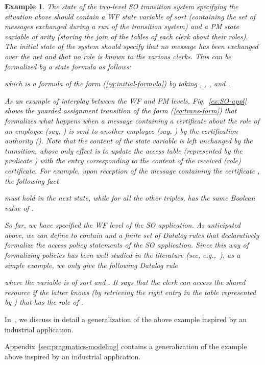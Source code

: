 \documentclass[conference]{IEEEtran}
\newtheorem{example}{Example}
\newcommand{\close}{\IEEEQEDclosed}
\begin{document}
\begin{example}
  The state of the two-level SO transition system specifying the situation
  above should contain a WF state variable  of sort
   (containing the set of messages exchanged during
  a run of the transition system) and a PM state variable
   of arity  (storing the join of the tables of each clerk about
  their roles).  The initial state of the system
  should specify that no message has been exchanged over the net and
  that no role is known to the various clerks.  This can be formalized
  by a state formula as follows:
  
  which is a formula of the form (\ref{eq:initial-formula}) by taking
  , ,
  , and .

  As an example of interplay between the WF and PM levels,
  Fig.~\ref{ex:SO-appl} shows the guarded assignment transition of the
  form (\ref{eq:trans-form}) that formalizes what happens when a
  message containing a certificate about the role of an employee (say,
  ) is sent to another employee (say, )
  by the certification authority ().  Note that the
  content of the state variable  is left unchanged by
  the transition, whose only effect is to update the access table
  (represented by the predicate ) with the entry
  corresponding to the content of the received (role) certificate.
  For example, upon reception of the message containing the
  certificate , the following fact
  
  must hold in the next state, while for all the other triples,
   has the same Boolean value of
  .

  So far, we have specified the WF level of the SO application.  As
  anticipated above, we can define  to contain  and a
  finite set of Datalog rules that declaratively formalize the access
  policy statements of the SO application.  Since this way of
  formalizing policies has been well studied in the literature (see,
  e.g.,~\cite{deTreville:Binder}), as a simple example, we only give
  the following Datalog rule
  
  where the variable  is of sort  and
  .  It says that the clerk 
  can access the shared resource  if the latter knows
  (by retrieving the right entry in the table represented by
  ) that  has the role of .
  \hfill \close
\end{example}

\begin{SHORT}
  In~\cite{BRV-TR09}, we discuss in detail a generalization of the above
  example inspired by an industrial application.
\end{SHORT}
\begin{LONG}
  Appendix~\ref{sec:pragmatics-modeling} contains a generalization of
  the example above inspired by an industrial application.
\end{LONG}
\end{document}
